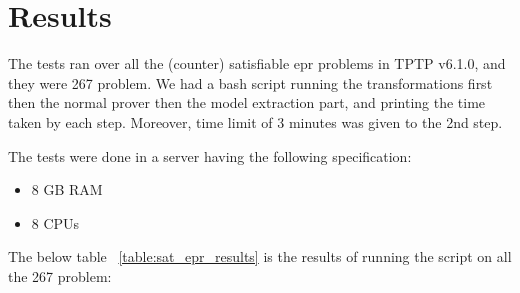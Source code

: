 \chapter{Results}\label{chap:res_and_lit}


The tests ran over all the (counter) satisfiable \ac{epr} problems in TPTP v6.1.0, and they were 267 problem. We had a bash script running the transformations first then the normal prover then the model extraction part, and printing the time taken by each step. Moreover, time limit of 3 minutes was given to the 2nd step.


The tests were done in a server having the following specification:
\begin{itemize}
	\item 8 GB RAM
	\item 8 CPUs
\end{itemize}


The below table ~\ref{table:sat_epr_results} is the results of running the script on all the 267 problem:

